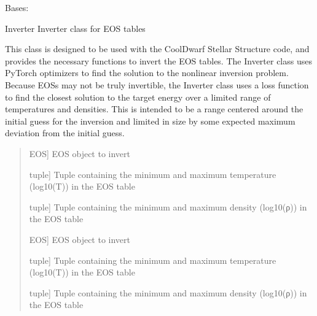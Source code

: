 \documentclass[letterpaper,10pt,english]{sphinxmanual}
\begin{document}
\begin{fulllineitems}
\label{\detokenize{CoolDwarf.EOS.invert:CoolDwarf.EOS.invert.EOSInverter.Inverter}}
\pysigstartsignatures
{}
\pysigstopsignatures
\sphinxAtStartPar
Bases: 

\sphinxAtStartPar
Inverter \textendash{} Inverter class for EOS tables

\sphinxAtStartPar
This class is designed to be used with the CoolDwarf Stellar Structure code, and provides the necessary functions
to invert the EOS tables. The Inverter class uses PyTorch optimizers to find the solution to the non\sphinxhyphen{}linear inversion problem.
Because EOSs may not be truly invertible, the Inverter class uses a loss function to find the closest solution to the target energy
over a limited range of temperatures and densities. This is intended to be a range centered around the initial guess for the inversion
and limited in size by some expected maximum deviation from the initial guess.
\begin{quote}\begin{description}
\begin{description}
\sphinxlineitem{\sphinxstylestrong{EOS}}{[}EOS{]}
\sphinxAtStartPar
EOS object to invert

\sphinxlineitem{\sphinxstylestrong{TRange}}{[}tuple{]}
\sphinxAtStartPar
Tuple containing the minimum and maximum temperature (log10(T)) in the EOS table

\sphinxlineitem{\sphinxstylestrong{RhoRange}}{[}tuple{]}
\sphinxAtStartPar
Tuple containing the minimum and maximum density (log10(ρ)) in the EOS table

\end{description}

\begin{description}
\sphinxlineitem{\sphinxstylestrong{EOS}}{[}EOS{]}
\sphinxAtStartPar
EOS object to invert

\sphinxlineitem{\sphinxstylestrong{\_TRange}}{[}tuple{]}
\sphinxAtStartPar
Tuple containing the minimum and maximum temperature (log10(T)) in the EOS table

\sphinxlineitem{\sphinxstylestrong{\_RhoRange}}{[}tuple{]}
\sphinxAtStartPar
Tuple containing the minimum and maximum density (log10(ρ)) in the EOS table


\end{description}
\end{description}
\end{quote}
\end{fulllineitems}
\end{document}

